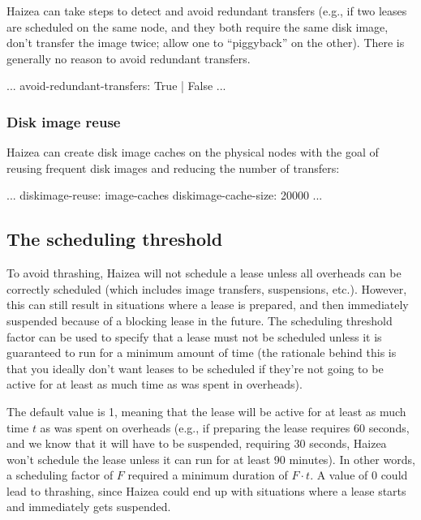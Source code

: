 Haizea can take steps to
detect and avoid redundant transfers (e.g., if two leases are
scheduled on the same node, and they both require the same disk
image, don't transfer the image twice; allow one to ``piggyback''
on the other). There is generally no reason to avoid redundant transfers.

\begin{wideshellverbatim}
...
avoid-redundant-transfers: True | False
...
\end{wideshellverbatim}


\subsubsection{Disk image reuse}

Haizea can create disk image caches on the physical nodes with the goal of reusing frequent disk images and reducing the number of transfers: 

\begin{wideshellverbatim}
...
diskimage-reuse: image-caches
diskimage-cache-size: 20000
...
\end{wideshellverbatim}


\subsection{The scheduling threshold}

To avoid thrashing, Haizea will not schedule a lease unless all overheads
can be correctly scheduled (which includes image transfers, suspensions, etc.).
However, this can still result in situations where a lease is prepared,
and then immediately suspended because of a blocking lease in the future.
The scheduling threshold factor can be used to specify that a lease must
not be scheduled unless it is guaranteed to run for a minimum amount of
time (the rationale behind this is that you ideally don't want leases
to be scheduled if they're not going to be active for at least as much time
as was spent in overheads).
            
The default value is 1, meaning that the lease will be active for at least
as much time $t$ as was spent on overheads (e.g., if preparing the lease requires
60 seconds, and we know that it will have to be suspended, requiring 30 seconds,
Haizea won't schedule the lease unless it can run for at least 90 minutes).
In other words, a scheduling factor of $F$ required a minimum duration of 
$F\cdot t$. A value of 0 could lead to thrashing, since Haizea could end up with
situations where a lease starts and immediately gets suspended.   


